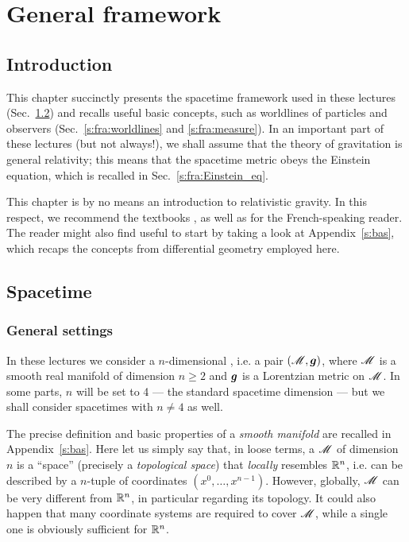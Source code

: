 \chapter{General framework} \label{s:fra}

\minitoc

\section{Introduction}

This chapter succinctly presents the spacetime framework used in these lectures
(Sec.~\ref{s:fra:spacetime})
and recalls useful basic concepts, such as worldlines of particles and observers
(Sec.~\ref{s:fra:worldlines} and \ref{s:fra:measure}).
In an important part of these lectures (but not always!),
we shall assume that the theory of gravitation is general
relativity; this means that the spacetime metric obeys the Einstein equation,
which is recalled in Sec.~\ref{s:fra:Einstein_eq}.

This chapter is by no means an introduction to relativistic gravity. In this respect, we
recommend the textbooks \cite{Carro04,Choqu15,DerueU18,Hartl03,MisneTW73,Strau13,Wald84}, as well as \cite{DerueU14,Gourg14,Langl13} for the French-speaking reader.
The reader might also find useful to start by taking a look at Appendix~\ref{s:bas}, which
recaps the concepts from differential geometry employed here.

\section{Spacetime} \label{s:fra:spacetime}

\subsection{General settings} \label{s:fra:general_settings}

In these lectures we consider a $n$-dimensional ,
i.e. a pair $(\mathscr{M}, \bm{g})$, where $\mathscr{M}$ is a smooth real manifold of dimension $n\geq 2$
and $\bm{g}$ is a Lorentzian metric on $\mathscr{M}$. In some parts, $n$ will be set to 4
--- the standard spacetime dimension --- but we shall consider spacetimes with
$n\neq 4$ as well.

The precise definition and basic properties of a \emph{smooth manifold} are recalled
in Appendix~\ref{s:bas}. Here let us simply say that, in loose terms,
a  $\mathscr{M}$ of dimension $n$ is a ``space'' (precisely a
\emph{topological space}) that \emph{locally} resembles $\mathbb{R}^n$,
i.e. can be described by a $n$-tuple of coordinates $(x^0,\ldots,x^{n-1})$. However, globally,
$\mathscr{M}$ can be very different from $\mathbb{R}^n$, in particular regarding its topology. It could also happen
that many coordinate systems are required to cover $\mathscr{M}$, while a single one is obviously
sufficient for $\mathbb{R}^n$.

